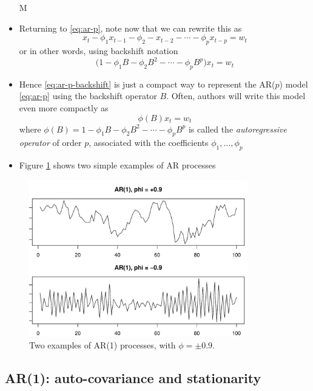 \documentclass{article}
\begin{document}
\begin{itemize}
M\item Returning to \eqref{eq:ar-p}, note now that we can rewrite this as 
  \[
  x_t - \phi_1 x_{t-1} - \phi_2 - x_{t-2} - \cdots - \phi_p x_{t-p} = w_t  
  \]
  or in other words, using backshift notation 
  \begin{equation}
  \label{eq:ar-p-backshift}
  \Big(1 - \phi_1 B - \phi_2 B^2 - \cdots - \phi_p B^p \Big) x_t = w_t 
  \end{equation}

\item Hence \eqref{eq:ar-p-backshift} is just a compact way to represent the
  AR($p$) model \eqref{eq:ar-p} using the backshift operator $B$. Often, authors
  will write this model even more compactly as  
  \begin{equation}
  \label{eq:ar-p-operator}
  \phi(B) x_t = w_t 
  \end{equation}
  where $\phi(B) = 1 - \phi_1 B - \phi_2 B^2 - \cdots - \phi_p B^p$ is called
  the \emph{autoregressive operator} of order $p$, associated with the
  coefficients $\phi_1,\dots,\phi_p$

\item Figure \ref{fig:ar} shows two simple examples of AR processes
\end{itemize}

\begin{figure}[htb]
\centering
\includegraphics[width=0.85\textwidth]{fig/ar-1.pdf}
\caption{Two examples of AR(1) processes, with $\phi = \pm 0.9$.}
\label{fig:ar}
\end{figure}

\subsection{AR(1): auto-covariance and stationarity}
\end{document}
